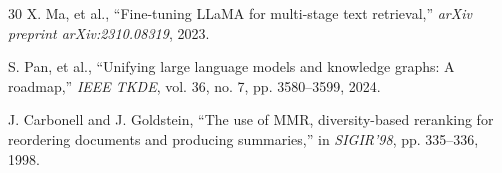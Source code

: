 \documentclass[journal]{IEEEtran}
\begin{document}
\begin{thebibliography}{30}
X. Ma, et al., ``Fine-tuning LLaMA for multi-stage text retrieval,'' \textit{arXiv preprint arXiv:2310.08319}, 2023.

S. Pan, et al., ``Unifying large language models and knowledge graphs: A roadmap,'' \textit{IEEE TKDE}, vol. 36, no. 7, pp. 3580--3599, 2024.

J. Carbonell and J. Goldstein, ``The use of MMR, diversity-based reranking for reordering documents and producing summaries,'' in \textit{SIGIR'98}, pp. 335--336, 1998.

\end{thebibliography}
\end{document}
